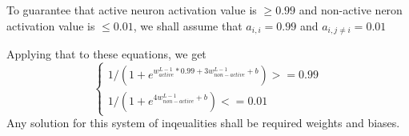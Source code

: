 \documentclass{article}
\begin{document}
To guarantee that active neuron activation value is $\geq 0.99$ and non-active neron activation value is $\leq 0.01$, we shall assume that $a_{i,i} = 0.99$ and $a_{i,j \neq i} = 0.01$

Applying that to these equations, we get
\[
\begin{cases}
1/(1 + e^{w_{active}^{L-1} * 0.99 + 3w_{non-active}^{L-1} + b}) >= 0.99\\
1/(1 + e^{4w_{non-active}^{L-1} + b}) <= 0.01
\end{cases}
\]
Any solution for this system of inqeualities shall be required weights and biases. 
\end{document}
